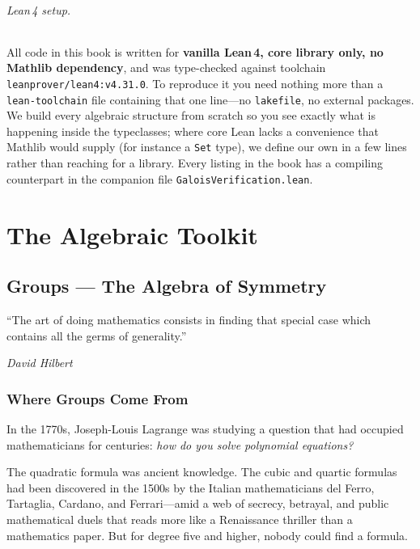 \documentclass[11pt, a4paper, oneside]{book}
\newcommand{\lc}[1]{\texttt{#1}}
\begin{document}
\paragraph{Lean\,4 setup.}
All code in this book is written for \textbf{vanilla Lean\,4, core library only,
no Mathlib dependency}, and was type-checked against toolchain
\texttt{leanprover/lean4:v4.31.0}. To reproduce it you need nothing more than a
\texttt{lean-toolchain} file containing that one line---no \texttt{lakefile}, no
external packages. We build every algebraic structure from scratch so you see
exactly what is happening inside the typeclasses; where core Lean lacks a
convenience that Mathlib would supply (for instance a \lc{Set} type), we define
our own in a few lines rather than reaching for a library. Every listing in the
book has a compiling counterpart in the companion file
\texttt{GaloisVerification.lean}.

\mainmatter
\color{black}  %

\part{The Algebraic Toolkit}

\chapter{Groups --- The Algebra of Symmetry}

\epigraph{``The art of doing mathematics consists in finding that special case
which contains all the germs of generality.''}{\textit{David Hilbert}}

\section{Where Groups Come From}

In the 1770s, Joseph-Louis Lagrange was studying a question that had occupied
mathematicians for centuries: \emph{how do you solve polynomial equations?}

The quadratic formula was ancient knowledge. The cubic and quartic formulas had
been discovered in the 1500s by the Italian mathematicians del Ferro,
Tartaglia, Cardano, and Ferrari---amid a web of secrecy, betrayal, and public
mathematical duels that reads more like a Renaissance thriller than a
mathematics paper. But for degree five and higher, nobody could find a formula.
\end{document}
